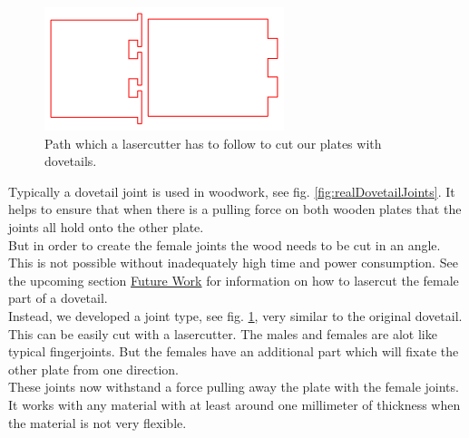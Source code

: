 \documentclass[../ClassicThesis.tex]{subfiles}
\begin{document}
\begin{figure}[!ht]
\centering
\includegraphics[width=.5\columnwidth]{Images/schwalbe.png}
\caption{Path which a lasercutter has to follow to cut our plates with dovetails.}
\label{fig:dovetailJoints}
\end{figure}
    
    Typically a dovetail joint is used in woodwork, see fig. \ref{fig:realDovetailJoints}. It helps to ensure that when there is a pulling force on both wooden plates that the joints all hold onto the other plate.\\
    But in order to create the female joints the wood needs to be cut in an angle. This is not possible without inadequately high time and power consumption. See the upcoming section \hyperref[futureWork]{Future Work} for information on how to lasercut the female part of a dovetail.\\
    Instead, we developed a joint type, see fig. \ref{fig:dovetailJoints}, very similar to the original dovetail. This can be easily cut with a lasercutter.
    The males and females are alot like typical fingerjoints. But the females have an additional part which will fixate the other plate from one direction.\\
    These joints now withstand a force pulling away the plate with the female joints. It works with any material with at least around one millimeter of thickness when the material is not very flexible.
\end{document}
